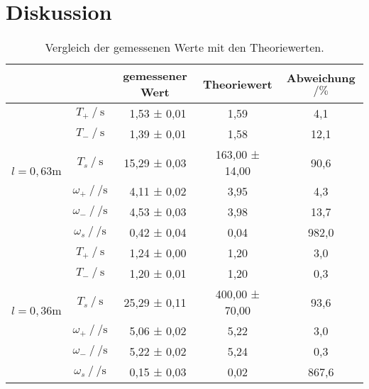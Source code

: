 \section{Diskussion}
\label{sec:Diskussion}

\begin{table}[H]
    \centering
    \caption{Vergleich der gemessenen Werte mit den Theoriewerten.}
    \label{tab:Vergleich}
    \begin{tabular}{c c c c S}
      \toprule
      &&{gemessener Wert}&{Theoriewert}&{Abweichung $\mathbin{/} \si{\percent}$}\\
      \midrule
        &{$T_+ \mathbin{/} \si{\second}$} & \, 1,53 ± 0,01 & 1,59 & 4,1 \\
        &{$T_- \mathbin{/} \si{\second}$} & \, 1,39 ± 0,01 & 1,58 & 12,1 \\
        &{$T_s \mathbin{/} \si{\second}$} & 15,29 ± 0,03 & 163,00 ± 14,00 & 90,6\\ 
        &{$\omega_+ \mathbin{/} \si{\per\second}$} & \, 4,11 ± 0,02 & 3,95 & 4,3\\
        &{$\omega_- \mathbin{/} \si{\per\second}$} & \, 4,53 ± 0,03 & 3,98 & 13,7\\
        &{$\omega_s \mathbin{/} \si{\per\second}$} & \, 0,42 ± 0,04 & 0,04 & 982,0\\
        \midrule
        &{$T_+ \mathbin{/} \si{\second}$} & \, 1,24 ± 0,00 & 1,20 & 3,0\\
        &{$T_- \mathbin{/} \si{\second}$} & \, 1,20 ± 0,01 & 1,20 & 0,3\\
        &{$T_s \mathbin{/} \si{\second}$} & 25,29 ± 0,11 & 400,00 ± 70,00 & 93,6\\ 
        &{$\omega_+ \mathbin{/} \si{\per\second}$} & \, 5,06 ± 0,02 & 5,22 & 3,0\\
        &{$\omega_- \mathbin{/} \si{\per\second}$} & \, 5,22 ± 0,02 & 5,24 & 0,3 \\
        &{$\omega_s \mathbin{/} \si{\per\second}$} & \, 0,15 ± 0,03 & 0,02 & 867,6\\
      \bottomrule
    \end{tabular}
\end{table}

